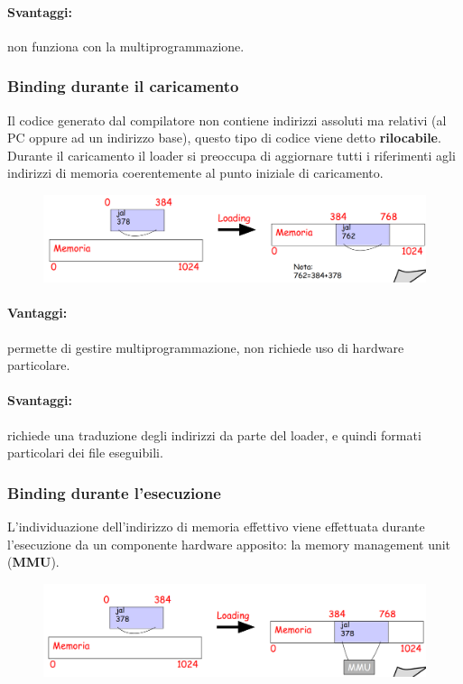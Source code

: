 \paragraph{Svantaggi:} non funziona con la multiprogrammazione.

\subsubsection{Binding durante il caricamento}
Il codice generato dal compilatore non contiene indirizzi assoluti ma relativi (al PC oppure ad un indirizzo base), questo tipo di codice viene detto \textbf{rilocabile}.
Durante il caricamento il loader si preoccupa di aggiornare tutti i riferimenti agli indirizzi di memoria coerentemente al punto iniziale di caricamento.
\begin{figure} [h]
    \centering
    \includegraphics[width=0.7\linewidth]{Images/Screenshot 2025-01-16 at 18-30-35 so-05-memoria - so-05-memoria.pdf.png}
\end{figure}

\paragraph{Vantaggi:} permette di gestire multiprogrammazione, non richiede uso di hardware particolare.
\paragraph{Svantaggi:} richiede una traduzione degli indirizzi da parte del loader, e quindi formati particolari dei file eseguibili.

\subsubsection{Binding durante l'esecuzione}
L'individuazione dell'indirizzo di memoria effettivo viene effettuata durante l'esecuzione da un componente hardware apposito:
la memory management unit (\textbf{MMU}).

\begin{figure} [h]
    \centering
    \includegraphics[width=0.7\linewidth]{Images/Screenshot 2025-01-16 at 18-33-56 so-05-memoria - so-05-memoria.pdf.png}
\end{figure}

